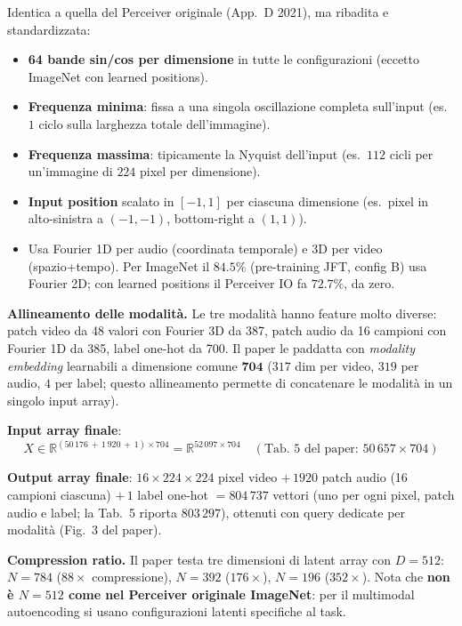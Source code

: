 \documentclass[
  11pt,
]{article}
\begin{document}
\begin{notabox}[title={\textbf{Convenzione Fourier features del paper IO (App.\ G)}}]
Identica a quella del Perceiver originale (App.\ D 2021), ma ribadita e standardizzata:
\begin{itemize}\setlength\itemsep{0.1em}
\item \textbf{64 bande sin/cos per dimensione} in tutte le configurazioni (eccetto ImageNet con learned positions).
\item \textbf{Frequenza minima}: fissa a una singola oscillazione completa sull'input (es.\ $1$ ciclo sulla larghezza totale dell'immagine).
\item \textbf{Frequenza massima}: tipicamente la Nyquist dell'input (es.\ $112$ cicli per un'immagine di $224$ pixel per dimensione).
\item \textbf{Input position} scalato in $[-1, 1]$ per ciascuna dimensione (es.\ pixel in alto-sinistra a $(-1,-1)$, bottom-right a $(1,1)$).
\item Usa Fourier 1D per audio (coordinata temporale) e 3D per video (spazio+tempo). Per ImageNet il $84.5\%$ (pre-training JFT, config B) usa Fourier 2D; con learned positions il Perceiver IO fa $72.7\%$, da zero.
\end{itemize}
\end{notabox}

\textbf{Allineamento delle modalità.} Le tre modalità hanno feature molto diverse: patch video da 48 valori con Fourier 3D da 387, patch audio da 16 campioni con Fourier 1D da 385, label one-hot da 700. Il paper le paddatta con \emph{modality embedding} learnabili a dimensione comune $\mathbf{704}$ ($317$ dim per video, $319$ per audio, $4$ per label; questo allineamento permette di concatenare le modalità in un singolo input array).

\textbf{Input array finale}:
\[
X \in \mathbb{R}^{(50\,176\, +\, 1\,920\, +\, 1) \times 704} = \mathbb{R}^{52\,097 \times 704} \quad (\text{Tab.~5 del paper: } 50\,657 \times 704)
\]

\textbf{Output array finale}: $16 \times 224 \times 224$ pixel video $+\, 1920$ patch audio (16 campioni ciascuna) $+\, 1$ label one-hot $= 804\,737$ vettori (uno per ogni pixel, patch audio e label; la Tab.~5 riporta $803\,297$), ottenuti con query dedicate per modalità (Fig.\ 3 del paper).

\textbf{Compression ratio.} Il paper testa tre dimensioni di latent array con $D = 512$: $N = 784$ ($88\times$ compressione), $N = 392$ ($176\times$), $N = 196$ ($352\times$). Nota che \textbf{non è $N=512$ come nel Perceiver originale ImageNet}: per il multimodal autoencoding si usano configurazioni latenti specifiche al task.
\end{document}
